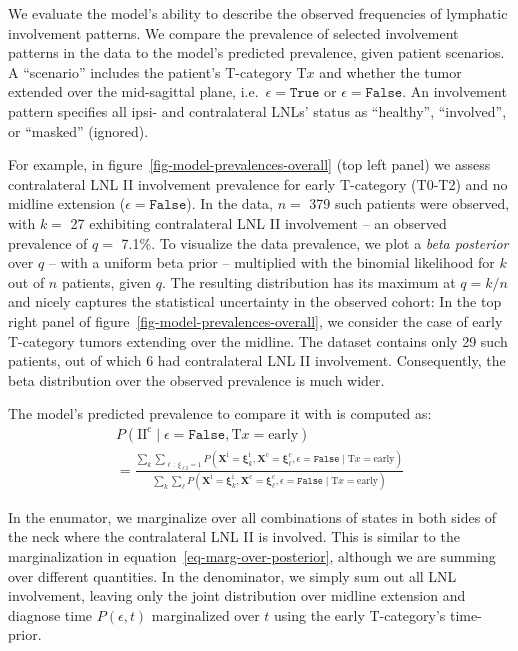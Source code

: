 \documentclass[
  sn-mathphys-num,
]{sn-jnl}
\begin{document}
We evaluate the model's ability to describe the observed frequencies of
lymphatic involvement patterns. We compare the prevalence of selected
involvement patterns in the data to the model's predicted prevalence,
given patient scenarios. A ``scenario'' includes the patient's
T-category \(\text{T}x\) and whether the tumor extended over the
mid-sagittal plane, i.e.~\(\epsilon=\texttt{True}\) or
\(\epsilon=\texttt{False}\). An involvement pattern specifies all ipsi-
and contralateral LNLs' status as ``healthy'', ``involved'', or
``masked'' (ignored).

For example, in figure~\ref{fig-model-prevalences-overall} (top left
panel) we assess contralateral LNL II involvement prevalence for early
T-category (T0-T2) and no midline extension
(\(\epsilon=\texttt{False}\)). In the data, \(n=\) 379 such patients
were observed, with \(k=\) 27 exhibiting contralateral LNL II
involvement -- an observed prevalence of \(q=\) 7.1\%. To visualize the
data prevalence, we plot a \emph{beta posterior} over \(q\) -- with a
uniform beta prior -- multiplied with the binomial likelihood for \(k\)
out of \(n\) patients, given \(q\). The resulting distribution has its
maximum at \(q=k / n\) and nicely captures the statistical uncertainty
in the observed cohort: In the top right panel of
figure~\ref{fig-model-prevalences-overall}, we consider the case of
early T-category tumors extending over the midline. The dataset contains
only 29 such patients, out of which 6 had contralateral LNL II
involvement. Consequently, the beta distribution over the observed
prevalence is much wider.

The model's predicted prevalence to compare it with is computed as:
%
\[
\begin{multlined}
P \left( \text{II}^\text{c} \mid \epsilon=\texttt{False}, \text{T}x=\text{early} \right) \\ = \frac{ \sum_k \sum_{\ell \, : \, \xi_{\ell 2}=1}  P \left( \mathbf{X}^\text{i}=\boldsymbol{\xi}_k^\text{i}, \mathbf{X}^\text{c}=\boldsymbol{\xi}_\ell^\text{c}, \epsilon=\texttt{False} \mid \text{T}x=\text{early} \right)}{ \sum_k \sum_\ell P \left(\mathbf{X}^\text{i}=\boldsymbol{\xi}_k^\text{i}, \mathbf{X}^\text{c}=\boldsymbol{\xi}_\ell^\text{c}, \epsilon=\texttt{False} \mid \text{T}x=\text{early} \right)}
\end{multlined}
\]

In the enumator, we marginalize over all combinations of states in both
sides of the neck where the contralateral LNL II is involved. This is
similar to the marginalization in equation~\ref{eq-marg-over-posterior},
although we are summing over different quantities. In the denominator,
we simply sum out all LNL involvement, leaving only the joint
distribution over midline extension and diagnose time
\(P \left( \epsilon, t \right)\) marginalized over \(t\) using the early
T-category's time-prior.
\end{document}

